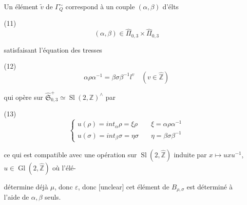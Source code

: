 \begin{enumerate}
Un élément $\tilde{v}$ de $\Gamma_Q^\sim$ correspond à
un couple $(\alpha, \beta)$ d'élts

(11) $$ (\alpha, \beta) \in \widehat{\Pi}_{0,3} \times \widehat{\Pi}_{0,3} $$

satisfaisant l'équation des tresses

(12) $$ \alpha \rho \alpha^{-1} = \beta \sigma \beta^{-1} l^v \quad (v \in \hat{\mathbb{Z}}) $$

qui opère sur $\widehat{\mathfrak{S}}_{0,3}^+ \simeq \operatorname{Sl}(2, \mathbb{Z})^\wedge$ par

(13)
$$ \begin{cases} u(\rho) = int_\alpha \rho = \xi \rho \quad & \xi = \alpha \rho \alpha^{-1} \\ u(\sigma) = int_\beta \sigma = \eta \sigma \quad & \eta = \beta \sigma \beta^{-1} \end{cases} $$

ce qui est compatible avec une opération
sur $\operatorname{Sl}(2, \hat{\mathbb{Z}})$ induite
par $x \mapsto u x u^{-1}$, $u \in \operatorname{Gl}(2, \hat{\mathbb{Z}})$ où l'élé-

\newpage



\newpage



\newpage



\newpage



\newpage



\newpage



\newpage


détermine déjà $\mu$, donc $\varepsilon$, donc [unclear]
cet élément de $B_{\rho,\sigma}$ est déterminé
à l'aide de $\alpha, \beta$ seuls.


\end{enumerate}
